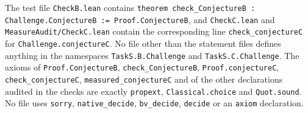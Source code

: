 \documentclass[11pt]{article}
\theoremstyle{definition}
\theoremstyle{remark}
\begin{document}
{\noindent The test file \texttt{CheckB.lean} contains
\texttt{theorem check\_\allowbreak ConjectureB : Challenge.ConjectureB :=
Proof.ConjectureB}, and \texttt{CheckC.lean} and
\texttt{MeasureAudit/CheckC.lean} contain the corresponding line
\texttt{check\_\allowbreak conjectureC} for \texttt{Challenge.conjectureC}.
No file other than the statement files defines anything in the namespaces
\texttt{TaskS.B.Challenge} and \texttt{TaskS.C.Challenge}. The axioms of
\texttt{Proof.ConjectureB}, \texttt{check\_\allowbreak ConjectureB},
\texttt{Proof.conjectureC}, \texttt{check\_\allowbreak conjectureC},
\texttt{measured\_\allowbreak conjectureC} and of the other declarations
audited in the checks are exactly \texttt{propext}, \texttt{Classical.choice}
and \texttt{Quot.sound}. No file uses \texttt{sorry},
\texttt{native\_\allowbreak decide}, \texttt{bv\_\allowbreak decide},
\texttt{decide} or an \texttt{axiom} declaration.

}
\end{document}
